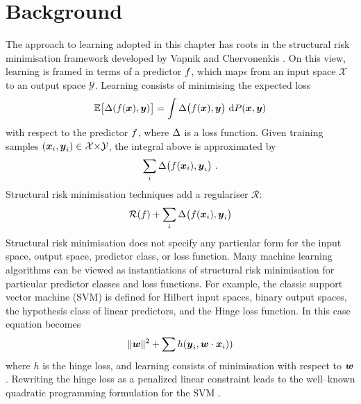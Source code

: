 \section{Background}

\newcommand\inp{\vect{x}}
\newcommand\outp{\vect{y}}

The approach to learning adopted in this chapter has roots in the
structural risk minimisation framework developed by Vapnik and
Chervonenkis \cite{Vapnik1998}. On this view, learning is framed in
terms of a predictor $\Predictor$, which maps from an input space
$\mathcal{X}$ to an output space $\mathcal{Y}$. Learning consists of
minimising the expected loss
\begin{equation}
  \label{eq:expected-utility-maximization}
  \Expected\bigl[ \Loss(f(\inp),\outp) \bigr] 
  =
  \int \Loss\bigl(\Predictor(\inp),\outp\bigr) ~ \intd P(\inp,\outp)
\end{equation}
with respect to the predictor $\Predictor$, where $\Loss$ is a loss
function. Given training samples
$(\inp_i,\outp_i)\in\mathcal{X}\cross\mathcal{Y}$, the integral above
is approximated by\changedsinceviva
\begin{equation}
  \label{eq:erm}
  \sum_i \Loss\bigl(\Predictor(\inp_i),\outp_i\bigr)~.
\end{equation}
Structural risk minimisation techniques add a regulariser
$\mathcal{R}$:\changedsinceviva
\begin{equation}
  \label{eq:srm}
  \mathcal{R}(\Predictor) + \sum_i \Loss\bigl(\Predictor(\inp_i),\outp_i\bigr)
\end{equation}
Structural risk minimisation does not specify any particular form for
the input space, output space, predictor class, or loss function. Many
machine learning algorithms can be viewed as instantiations of
structural risk minimisation for particular predictor classes and loss
functions. For example, the classic support vector machine (SVM)
\cite{Cortes1995} is defined for Hilbert input spaces, binary output
spaces, the hypothesis class of linear predictors, and the Hinge loss
function. In this case equation  becomes
\begin{equation}
  \|\Model\|^2 + \sum h(\outp_i, \Model \cdot \inp_i))
\end{equation}
where $h$ is the hinge loss, and learning consists of minimisation
with respect to $\Model$. Rewriting the hinge loss as a penalized
linear constraint leads to the well--known quadratic programming
formulation for the SVM \cite{Cortes1995}.

